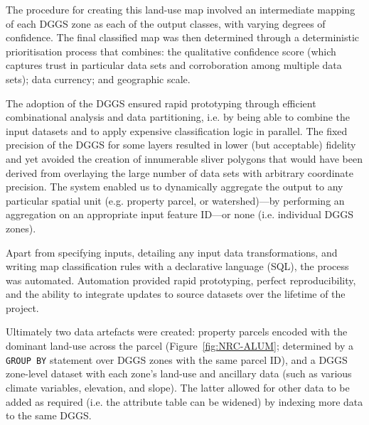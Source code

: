 \documentclass[]{interact}
\theoremstyle{plain}%
\theoremstyle{definition}
\theoremstyle{remark}
\begin{document}
The procedure for creating this land-use map involved an intermediate mapping of each \ac{DGGS} zone as each of the output classes, with varying degrees of confidence. The final classified map was then determined through a deterministic prioritisation process that combines: the qualitative confidence score (which captures trust in particular data sets and corroboration among multiple data sets); data currency; and geographic scale.

The adoption of the \ac{DGGS} ensured rapid prototyping through efficient combinational analysis and data partitioning, i.e. by being able to combine the input datasets and to apply expensive classification logic in parallel. The fixed precision of the \ac{DGGS} for some layers resulted in lower (but acceptable) fidelity and yet avoided the creation of innumerable sliver polygons that would have been derived from overlaying the large number of data sets with arbitrary coordinate precision. The system enabled us to dynamically aggregate the output to any particular spatial unit (e.g. property parcel, or watershed)---by performing an aggregation on an appropriate input feature ID---or none (i.e. individual \ac{DGGS} zones).

Apart from specifying inputs, detailing any input data transformations, and writing map classification rules with a declarative language (\ac{SQL}), the process was automated. Automation provided rapid prototyping, perfect reproducibility, and the ability to integrate updates to source datasets over the lifetime of the project.

Ultimately two data artefacts were created: property parcels encoded with the dominant land-use across the parcel (Figure~\ref{fig:NRC-ALUM}; determined by a \texttt{GROUP BY} statement over \ac{DGGS} zones with the same parcel ID), and a \ac{DGGS} zone-level dataset with each zone's land-use and ancillary data (such as various climate variables, elevation, and slope). The latter allowed for other data to be added as required (i.e. the attribute table can be widened) by indexing more data to the same DGGS.
\end{document}
